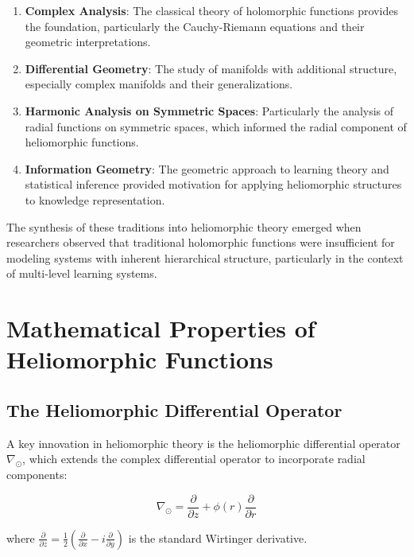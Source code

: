 \begin{enumerate}
    \item \textbf{Complex Analysis}: The classical theory of holomorphic functions provides the foundation, particularly the Cauchy-Riemann equations and their geometric interpretations.
    
    \item \textbf{Differential Geometry}: The study of manifolds with additional structure, especially complex manifolds and their generalizations.
    
    \item \textbf{Harmonic Analysis on Symmetric Spaces}: Particularly the analysis of radial functions on symmetric spaces, which informed the radial component of heliomorphic functions.
    
    \item \textbf{Information Geometry}: The geometric approach to learning theory and statistical inference provided motivation for applying heliomorphic structures to knowledge representation.
\end{enumerate}

The synthesis of these traditions into heliomorphic theory emerged when researchers observed that traditional holomorphic functions were insufficient for modeling systems with inherent hierarchical structure, particularly in the context of multi-level learning systems.

\section{Mathematical Properties of Heliomorphic Functions}

\subsection{The Heliomorphic Differential Operator}

A key innovation in heliomorphic theory is the heliomorphic differential operator $\nabla_{\odot}$, which extends the complex differential operator to incorporate radial components:

\begin{equation}
\nabla_{\odot} = \frac{\partial}{\partial z} + \phi(r) \frac{\partial}{\partial r}
\end{equation}

where $\frac{\partial}{\partial z} = \frac{1}{2}\left(\frac{\partial}{\partial x} - i\frac{\partial}{\partial y}\right)$ is the standard Wirtinger derivative.

